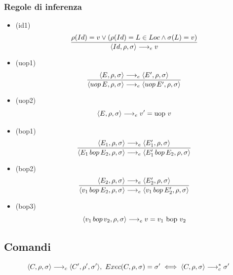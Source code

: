 \documentclass{article}
\begin{document}
\subsubsection*{Regole di inferenza}
\begin{itemize}
  \item (id1)
        \[\frac
          {\rho(Id) = v \lor (\rho(Id) = L \in Loc \land \sigma(L) = v)}
          {\langle Id,\rho,\sigma \rangle \longrightarrow_e v}\]

  \item (uop1)
        \[\frac
          {\langle E,\rho,\sigma \rangle \longrightarrow_e \langle E',\rho,\sigma \rangle}
          {\langle uop\,E,\rho,\sigma \rangle \longrightarrow_e \langle uop\,E',\rho,\sigma \rangle}\]
  \item (uop2)
        \[\langle E,\rho,\sigma \rangle \longrightarrow_e v' = \text{uop } v\]

  \item (bop1)
        \[\frac
          {\langle E_1,\rho,\sigma \rangle \longrightarrow_e \langle E_1',\rho,\sigma \rangle}
          {\langle E_1 \,bop\, E_2,\rho,\sigma \rangle \longrightarrow_e \langle E_1'\,bop\,E_2,\rho,\sigma \rangle}\]
  \item (bop2)
        \[\frac
          {\langle E_2,\rho,\sigma \rangle \longrightarrow_e \langle E_2',\rho,\sigma \rangle}
          {\langle v_1\,bop\,E_2,\rho,\sigma \rangle \longrightarrow_e \langle v_1\,bop\,E_2',\rho,\sigma \rangle}\]
  \item (bop3)
        \[\langle v_1\,bop\,v_2,\rho,\sigma \rangle \longrightarrow_e v = v_1 \text{ bop } v_2\]
\end{itemize}
\subsection*{Comandi}
\[\langle C,\rho,\sigma \rangle \longrightarrow_c \langle C',\rho',\sigma' \rangle,\ Exec(C,\rho,\sigma) = \sigma' \iff \langle C,\rho,\sigma \rangle \longrightarrow_c^* \sigma'\]
\end{document}
